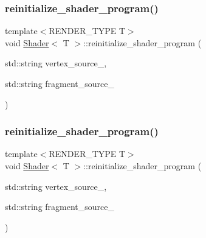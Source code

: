 \subsubsection{\texorpdfstring{reinitialize\+\_\+shader\+\_\+program()}{reinitialize\_shader\_program()}\hspace{0.1cm}{\footnotesize\ttfamily [1/2]}}
{\footnotesize\ttfamily template$<$R\+E\+N\+D\+E\+R\+\_\+\+T\+Y\+PE T$>$ \\
void \mbox{\hyperlink{classShader}{Shader}}$<$ T $>$\+::reinitialize\+\_\+shader\+\_\+program (\begin{DoxyParamCaption}\item[{std\+::string}]{vertex\+\_\+source\+\_\+,  }\item[{std\+::string}]{fragment\+\_\+source\+\_\+ }\end{DoxyParamCaption})\hspace{0.3cm}{\ttfamily [inline]}}

\mbox{\label{classShader_a519cf95dff88c4da52ab6a4c3494b441}} 
\subsubsection{\texorpdfstring{reinitialize\+\_\+shader\+\_\+program()}{reinitialize\_shader\_program()}\hspace{0.1cm}{\footnotesize\ttfamily [2/2]}}
{\footnotesize\ttfamily template$<$R\+E\+N\+D\+E\+R\+\_\+\+T\+Y\+PE T$>$ \\
void \mbox{\hyperlink{classShader}{Shader}}$<$ T $>$\+::reinitialize\+\_\+shader\+\_\+program (\begin{DoxyParamCaption}\item[{std\+::string}]{vertex\+\_\+source\+\_\+,  }\item[{std\+::string}]{fragment\+\_\+source\+\_\+ }\end{DoxyParamCaption})\hspace{0.3cm}{\ttfamily [inline]}}

\mbox{\label{classShader_a28b5fcd256a5182778c860c961ae6a31}} 

